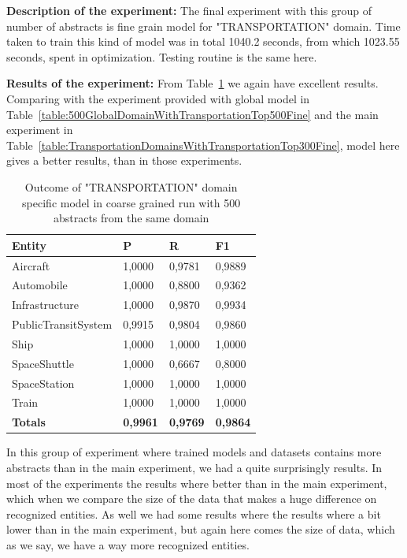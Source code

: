 \documentclass[thesis=M,english]{FITthesis}[2018/05/30]
\begin{document}
	\textbf{Description of the experiment:} The final experiment with this group of number of abstracts is fine grain model for "TRANSPORTATION" domain. Time taken to train this kind of model was in total 1040.2 seconds, from which 1023.55 seconds, spent in optimization. Testing routine is the same here.

	\textbf{Results of the experiment:} From Table~\ref{table:500TransportationDomainWithTransportationTop500Fine} we again have excellent results. Comparing with the experiment provided with global model in Table~\ref{table:500GlobalDomainWithTransportationTop500Fine} and the main experiment in Table~\ref{table:TransportationDomainsWithTransportationTop300Fine}, model here gives a better results, than in those experiments.
	
	\begin{table}[H]\centering
		\begin{tabular}{|l|l|l|l|}
			\hline {\textbf{Entity}} & {\textbf{P}} & {\textbf{R}} & {\textbf{F1}}\\\hline
				Aircraft & 1,0000 & 0,9781 & 0,9889\\
				Automobile & 1,0000 & 0,8800 & 0,9362\\				
				Infrastructure & 1,0000 & 0,9870 & 0,9934\\
				PublicTransitSystem & 0,9915 & 0,9804 & 0,9860\\
				Ship & 1,0000 & 1,0000 & 1,0000\\				
				SpaceShuttle & 1,0000 & 0,6667 & 0,8000\\
				SpaceStation & 1,0000 & 1,0000 & 1,0000\\
				Train & 1,0000 & 1,0000 & 1,0000\\\hline
				\textbf{Totals} & \textbf{0,9961} & \textbf{0,9769} & \textbf{0,9864}\\\hline
		\end{tabular}
		\caption{Outcome of "TRANSPORTATION" domain specific model in coarse grained run with 500 abstracts from the same domain \label{table:500TransportationDomainWithTransportationTop500Fine}}
	\end{table}	
		
	In this group of experiment where trained models and datasets contains more abstracts than in the main experiment, we had a quite surprisingly results. In most of the experiments the results where better than in the main experiment, which when we compare the size of the data that makes a huge difference on recognized entities. As well we had some results where the results where a bit lower than in the main experiment, but again here comes the size of data, which as we say, we have a way more recognized entities. 
	
\end{document}
